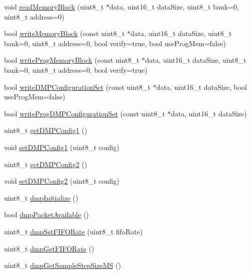 \begin{DoxyCompactItemize}
\item 
void \mbox{\hyperlink{classMPU6050_a04d8d5e7b62605aed15f07f52afa74ca}{read\+Memory\+Block}} (uint8\+\_\+t $\ast$data, uint16\+\_\+t data\+Size, uint8\+\_\+t bank=0, uint8\+\_\+t address=0)
\item 
bool \mbox{\hyperlink{classMPU6050_aae135772b45e1c7968b55f4f01b3757f}{write\+Memory\+Block}} (const uint8\+\_\+t $\ast$data, uint16\+\_\+t data\+Size, uint8\+\_\+t bank=0, uint8\+\_\+t address=0, bool verify=true, bool use\+Prog\+Mem=false)
\item 
bool \mbox{\hyperlink{classMPU6050_a201dc0aa819f451584c575c5a7590e10}{write\+Prog\+Memory\+Block}} (const uint8\+\_\+t $\ast$data, uint16\+\_\+t data\+Size, uint8\+\_\+t bank=0, uint8\+\_\+t address=0, bool verify=true)
\item 
bool \mbox{\hyperlink{classMPU6050_abe4f64f68164116b2ec94fe1d987929a}{write\+D\+M\+P\+Configuration\+Set}} (const uint8\+\_\+t $\ast$data, uint16\+\_\+t data\+Size, bool use\+Prog\+Mem=false)
\item 
bool \mbox{\hyperlink{classMPU6050_a160a3d018a81eb85a33874a43f44b3ea}{write\+Prog\+D\+M\+P\+Configuration\+Set}} (const uint8\+\_\+t $\ast$data, uint16\+\_\+t data\+Size)
\item 
uint8\+\_\+t \mbox{\hyperlink{classMPU6050_a421cdf4cea9fea87decbd69084ba4956}{get\+D\+M\+P\+Config1}} ()
\item 
void \mbox{\hyperlink{classMPU6050_a0126b95e4074de16bb61d9c4e4cf837f}{set\+D\+M\+P\+Config1}} (uint8\+\_\+t config)
\item 
uint8\+\_\+t \mbox{\hyperlink{classMPU6050_a29594027f88c291708a38fba67c4ecd5}{get\+D\+M\+P\+Config2}} ()
\item 
void \mbox{\hyperlink{classMPU6050_aea90c3e6a6666f070f7833a913cfa821}{set\+D\+M\+P\+Config2}} (uint8\+\_\+t config)
\item 
uint8\+\_\+t \mbox{\hyperlink{classMPU6050_a8b97688e8dd18be09865c2a31c4f3fe9}{dmp\+Initialize}} ()
\item 
bool \mbox{\hyperlink{classMPU6050_acac466f057c9ac7797a46c00cad66387}{dmp\+Packet\+Available}} ()
\item 
uint8\+\_\+t \mbox{\hyperlink{classMPU6050_a38853416eedf4074d15bc0ea4da47bd9}{dmp\+Set\+F\+I\+F\+O\+Rate}} (uint8\+\_\+t fifo\+Rate)
\item 
uint8\+\_\+t \mbox{\hyperlink{classMPU6050_abe2e585ddbb8ed4dd06287b97e399725}{dmp\+Get\+F\+I\+F\+O\+Rate}} ()
\item 
uint8\+\_\+t \mbox{\hyperlink{classMPU6050_a4f08483cb6b6f9917f602290fa4aee1b}{dmp\+Get\+Sample\+Step\+Size\+MS}} ()

\end{DoxyCompactItemize}
